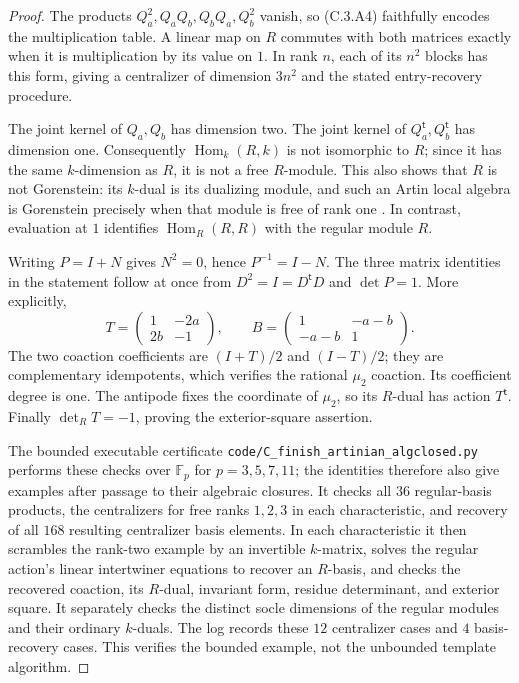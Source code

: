 \begin{proof}
The products $Q_a^2,Q_aQ_b,Q_bQ_a,Q_b^2$ vanish, so (C.3.A4)
faithfully encodes the multiplication table. A linear map on $R$
commutes with both matrices exactly when it is multiplication by its
value on $1$. In rank $n$, each of its $n^2$ blocks has this form,
giving a centralizer of dimension $3n^2$ and the stated entry-recovery
procedure.

The joint kernel of $Q_a,Q_b$ has dimension two. The joint kernel of
$Q_a^{\mathsf t},Q_b^{\mathsf t}$ has dimension one. Consequently
$\operatorname{Hom}_k(R,k)$ is not isomorphic to $R$; since it has
the same $k$-dimension as $R$, it is not a free $R$-module. This also
shows that $R$ is not Gorenstein: its $k$-dual is its dualizing module,
and such an Artin local algebra is Gorenstein precisely when that
module is free of rank one
\cite[Tags 0AX1 and 0DW6, Lemmas 47.16.1 and 47.21.4]{C-StacksArtinianDual}.
In contrast, evaluation at $1$ identifies
$\operatorname{Hom}_R(R,R)$ with the regular module $R$.

Writing $P=I+N$ gives $N^2=0$, hence $P^{-1}=I-N$.
The three matrix identities in the statement follow at once from
$D^2=I=D^{\mathsf t}D$ and $\det P=1$.
More explicitly,
\[
 T=\begin{pmatrix}1&-2a\\2b&-1\end{pmatrix},\qquad
 B=\begin{pmatrix}1&-a-b\\-a-b&1\end{pmatrix}.
\]
The two coaction coefficients are $(I+T)/2$ and $(I-T)/2$;
they are complementary idempotents, which verifies the rational
$\mu_2$ coaction. Its coefficient degree is one. The antipode
fixes the coordinate of $\mu_2$, so its $R$-dual has action
$T^{\mathsf t}$. Finally $\det_R T=-1$, proving the exterior-square
assertion.

The bounded executable certificate
\texttt{code/C\_finish\_artinian\_algclosed.py} performs these checks
over $\mathbb F_p$ for $p=3,5,7,11$; the identities therefore also
give examples after passage to their algebraic closures. It checks
all $36$ regular-basis products, the centralizers for free ranks
$1,2,3$ in each characteristic, and recovery of all $168$ resulting
centralizer basis elements. In each characteristic it then scrambles
the rank-two example by an invertible $k$-matrix, solves the regular
action's linear intertwiner equations to recover an $R$-basis, and
checks the recovered coaction, its $R$-dual, invariant form, residue
determinant, and exterior square. It separately checks the distinct
socle dimensions of the regular modules and their ordinary $k$-duals.
The log records these $12$ centralizer cases and $4$ basis-recovery
cases. This verifies the bounded example, not the unbounded template
algorithm.
\end{proof}

